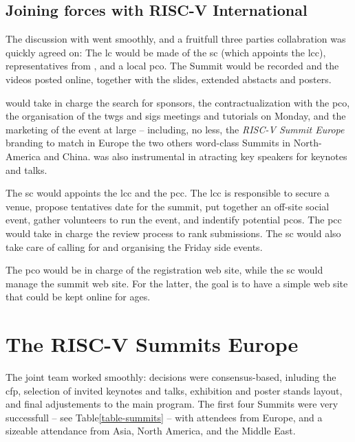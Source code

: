\documentclass[
	a4paper, %
	10pt, %
	unnumberedsections, %
	twoside, %
]{LTJournalArticle}
\begin{document}
\subsection{Joining forces with RISC-V International}

The discussion with  went smoothly, and a fruitfull
three parties collabration was quickly agreed on: The \gls{lc} would
be made of the \gls{sc} (which appoints the \gls{lcc}),
representatives from , and a local \gls{pco}. The
Summit would be recorded and the videos posted online, together with
the slides, extended abstacts and posters.

 would take in charge the search for sponsors, the
contractualization with the \gls{pco}, the organisation of the
\glspl{twg} and \glspl{sig} meetings and tutorials on Monday, and the
marketing of the event at large -- including, no less, the
\emph{RISC-V Summit Europe} branding to match in Europe the two others
word-class Summits in North-America and China.  was
also instrumental in atracting key speakers for keynotes and talks.

The \gls{sc} would appoints the \gls{lcc} and the \gls{pcc}. The
\gls{lcc} is responsible to secure a venue, propose tentatives date
for the summit, put together an off-site social event, gather
volunteers to run the event, and indentify potential \glspl{pco}. The
\gls{pcc} would take in charge the review process to rank
submissions. The \gls{sc} would also take care of calling for and
organising the Friday side events.

The \gls{pco} would be in charge of the registration web site, while
the \gls{sc} would manage the summit web site. For the latter, the
goal is to have a simple web site that could be kept online for ages.

\section{The RISC-V Summits Europe}

The joint team worked smoothly: decisions were
consensus-based, inluding the \gls{cfp}, selection of invited keynotes
and talks, exhibition and poster stands layout, and final
adjustements to the main program. The first four Summits were very
successfull -- see Table\;\ref{table-summits} -- with attendees from
Europe, and a sizeable attendance from Asia, North America, and the
Middle East.


\end{document}
